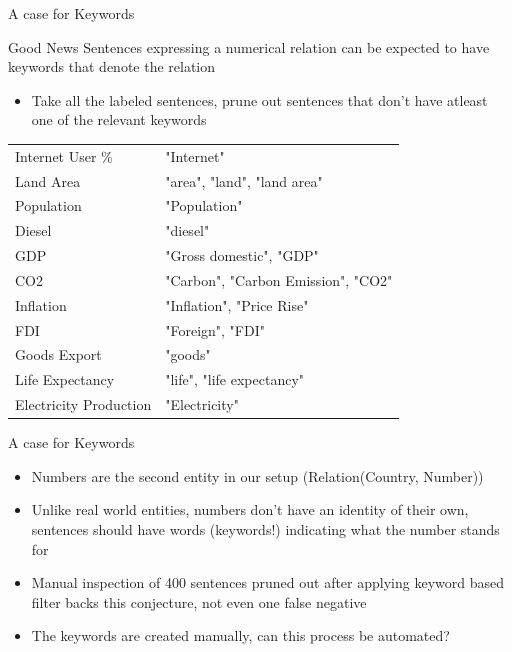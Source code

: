 \documentclass{beamer}
\begin{document}
\begin{frame}{A case for Keywords}
 \begin{exampleblock}{Good News}
  Sentences expressing a numerical relation can be expected to have keywords that denote the relation
 \end{exampleblock}

 \begin{itemize}
  \item Take all the labeled sentences, prune out sentences that don't have atleast one of the relevant keywords
 \end{itemize}
 
 \begin{tabular}{|l|l|}
  \hline
  Internet User \% & "Internet" \\
Land Area & "area", "land", "land area" \\
Population &"Population" \\
Diesel & "diesel" \\
GDP &"Gross domestic", "GDP" \\
CO2 &"Carbon", "Carbon Emission", "CO2" \\
Inflation & "Inflation", "Price Rise" \\
FDI & "Foreign", "FDI" \\
Goods Export & "goods" \\
Life Expectancy & "life", "life expectancy" \\
Electricity Production & "Electricity" \\
 \hline
 \end{tabular}
\end{frame}
\begin{frame}{A case for Keywords}
\begin{itemize}
  \item Numbers are the second entity in our setup (Relation(Country, Number))
  \item Unlike real world entities, numbers don't have an identity of their own, sentences should have words (keywords!) indicating what the number stands for
  \item Manual inspection of 400 sentences pruned out after applying keyword based filter backs this conjecture, not even one false negative
  \item The keywords are created manually, can this process be automated?
\end{itemize}
\end{frame}
\end{document}
